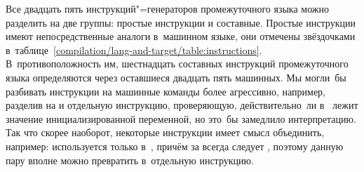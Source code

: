 Все двадцать пять инструкций"=генераторов промежуточного языка можно разделить
на две группы: простые инструкции и составные. Простые инструкции имеют
непосредственные аналоги в~машинном языке, они отмечены звёздочками
в~таблице~\ref{compilation/lang-and-target/table:instructions}.
В~противоположность им, шестнадцать составных инструкций промежуточного языка
определяются через оставшиеся двадцать пять машинных. Мы могли~бы разбивать
инструкции на машинные команды более агрессивно, например, разделив
 на  и отдельную инструкцию, проверяющую,
действительно~ли в~ лежит значение инициализированной переменной, но
это~бы замедлило интерпретацию. Так что скорее наоборот, некоторые инструкции
имеет смысл объединить, например:  используется только
в~, причём за  всегда следует , поэтому 
данную пару вполне можно превратить в~отдельную инструкцию.

